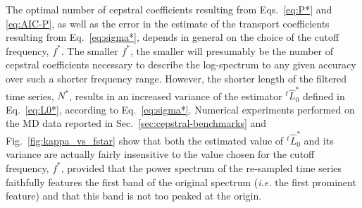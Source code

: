The optimal number of cepstral coefficients resulting from Eqs.~\eqref{eq:P*} and \eqref{eq:AIC-P}, as well as the error in the estimate of the transport coefficients resulting from Eq.~\eqref{eq:sigma*}, depends in general on the choice of the cutoff frequency, $f^*$. The smaller $f^*$, the smaller will presumably be the number of cepstral coefficients necessary to describe the log-spectrum to any given accuracy over such a shorter frequency range. However, the shorter length of the filtered time series, $N^*$, results in an increased variance of the estimator $^\ell{\hat L^*_0}$ defined in Eq.~\eqref{eq:L0*}, according to Eq.~\eqref{eq:sigma*}. Numerical experiments performed on the MD data reported in Sec.~\ref{sec:cepstral-benchmarks} and Fig.~\ref{fig:kappa_vs_fstar} show that both the estimated value of $^\ell{\hat L^*_0}$ and its variance are actually fairly insensitive to the value chosen for the cutoff frequency, $f^*$, provided that the power spectrum of the re-sampled time series faithfully features the first band of the original spectrum (\emph{i.e.} the first prominent feature) and that this band is not too peaked at the origin.



